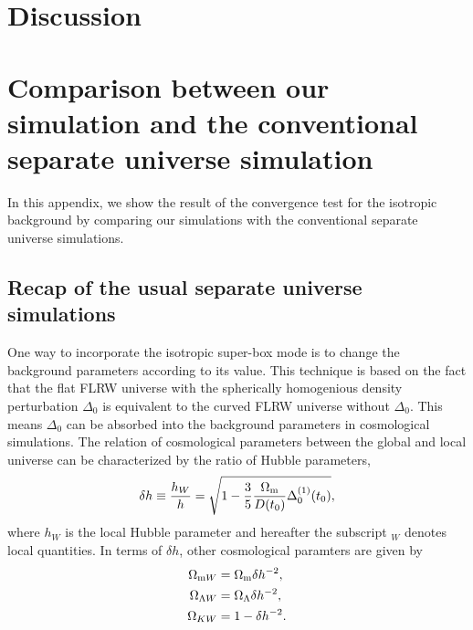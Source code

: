 \documentclass[a4paper,11pt]{article}
\begin{document}
\section{Discussion}
\label{sec:discuss}




\appendix

\section{Comparison between our simulation and the conventional separate universe simulation}
\label{app:SU_comp}
In this appendix, we show the result of the convergence test for the isotropic background
by comparing our simulations with the conventional separate universe simulations.
\subsection{Recap of the usual separate universe simulations}  
One way to incorporate the isotropic super-box mode is to change the background parameters according to its value.
This technique is based on the fact that
the flat FLRW universe with the spherically homogenious density perturbation $\Delta_0$ is
equivalent to the curved FLRW universe without $\Delta_0$.
This means $\Delta_0$ can be absorbed into the background parameters in cosmological simulations.
The relation of cosmological parameters between the global and local universe can be characterized 
by the ratio of Hubble parameters,
\begin{align}
\delta h \equiv \frac{h_W}{h} = \sqrt{1- \frac35 \frac{\Omega_{\rm m}}{D(t_0)}\Delta_0^{(1)}(t_0) },
\end{align} 
where $h_W$ is the local Hubble parameter and hereafter the subscript $_W$ denotes local quantities.
In terms of $\delta h$, other cosmological paramters are given by
\begin{align}
\Omega_{{\rm m}W} &= \Omega_{{\rm m}}  \delta h^{-2},\\
\Omega_{\Lambda W} &= \Omega_{\Lambda} \delta h^{-2},\\
\Omega_{KW} &= 1 - \delta h^{-2}.
\end{align}
\end{document}
